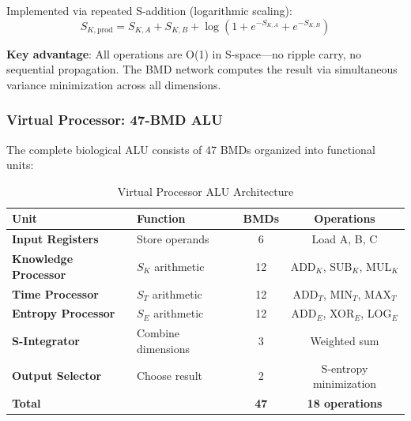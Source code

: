 \documentclass[11pt,a4paper]{article}
\begin{document}
Implemented via repeated S-addition (logarithmic scaling):
\begin{equation}
S_{K,\text{prod}} = S_{K,A} + S_{K,B} + \log(1 + e^{-S_{K,A}} + e^{-S_{K,B}})
\end{equation}

\textbf{Key advantage}: All operations are O(1) in S-space—no ripple carry, no sequential propagation. The BMD network computes the result via simultaneous variance minimization across all dimensions.

\subsubsection{Virtual Processor: 47-BMD ALU}

The complete biological ALU consists of 47 BMDs organized into functional units:

\begin{table}[H]
\centering
\caption{Virtual Processor ALU Architecture}
\begin{tabular}{llcc}
\toprule
\textbf{Unit} & \textbf{Function} & \textbf{BMDs} & \textbf{Operations} \\
\midrule
\textbf{Input Registers} & Store operands & 6 & Load A, B, C \\
\textbf{Knowledge Processor} & $S_K$ arithmetic & 12 & ADD$_K$, SUB$_K$, MUL$_K$ \\
\textbf{Time Processor} & $S_T$ arithmetic & 12 & ADD$_T$, MIN$_T$, MAX$_T$ \\
\textbf{Entropy Processor} & $S_E$ arithmetic & 12 & ADD$_E$, XOR$_E$, LOG$_E$ \\
\textbf{S-Integrator} & Combine dimensions & 3 & Weighted sum \\
\textbf{Output Selector} & Choose result & 2 & S-entropy minimization \\
\midrule
\textbf{Total} & & \textbf{47} & \textbf{18 operations} \\
\bottomrule
\end{tabular}
\end{table}
\end{document}
